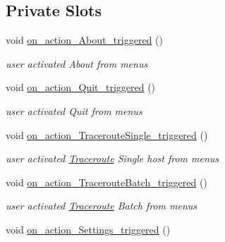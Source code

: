 \subsection*{Private Slots}
\begin{CompactItemize}
\item 
\hypertarget{classMainWindow_09de6bdff902ebcdccee3a1dd715f69b}{
void \hyperlink{classMainWindow_09de6bdff902ebcdccee3a1dd715f69b}{on\_\-action\_\-About\_\-triggered} ()}
\label{classMainWindow_09de6bdff902ebcdccee3a1dd715f69b}

\begin{CompactList}\small\item\em user activated About from menus \item\end{CompactList}\item 
\hypertarget{classMainWindow_0b8c6952362faeeee64487be46b5ae6d}{
void \hyperlink{classMainWindow_0b8c6952362faeeee64487be46b5ae6d}{on\_\-action\_\-Quit\_\-triggered} ()}
\label{classMainWindow_0b8c6952362faeeee64487be46b5ae6d}

\begin{CompactList}\small\item\em user activated Quit from menus \item\end{CompactList}\item 
\hypertarget{classMainWindow_4e373cf10e2cff2bd2f9cf0de2e379bc}{
void \hyperlink{classMainWindow_4e373cf10e2cff2bd2f9cf0de2e379bc}{on\_\-action\_\-TracerouteSingle\_\-triggered} ()}
\label{classMainWindow_4e373cf10e2cff2bd2f9cf0de2e379bc}

\begin{CompactList}\small\item\em user activated \hyperlink{classTraceroute}{Traceroute} Single host from menus \item\end{CompactList}\item 
\hypertarget{classMainWindow_05fb552f0feecb0a5c66264d5c55688b}{
void \hyperlink{classMainWindow_05fb552f0feecb0a5c66264d5c55688b}{on\_\-action\_\-TracerouteBatch\_\-triggered} ()}
\label{classMainWindow_05fb552f0feecb0a5c66264d5c55688b}

\begin{CompactList}\small\item\em user activated \hyperlink{classTraceroute}{Traceroute} Batch from menus \item\end{CompactList}\item 
\hypertarget{classMainWindow_9534f9eab823edea8333357bf19fed9d}{
void \hyperlink{classMainWindow_9534f9eab823edea8333357bf19fed9d}{on\_\-action\_\-Settings\_\-triggered} ()}
\label{classMainWindow_9534f9eab823edea8333357bf19fed9d}


\end{CompactItemize}
